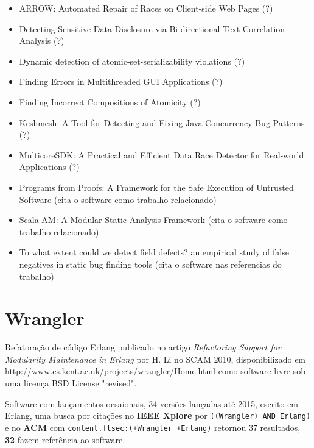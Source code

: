 \begin{itemize}
\item ARROW: Automated Repair of Races on Client-side Web Pages (?)
\item Detecting Sensitive Data Disclosure via Bi-directional Text Correlation Analysis (?)
\item Dynamic detection of atomic-set-serializability violations (?)
\item Finding Errors in Multithreaded GUI Applications (?)
\item Finding Incorrect Compositions of Atomicity (?)
\item Keshmesh: A Tool for Detecting and Fixing Java Concurrency Bug Patterns (?)
\item MulticoreSDK: A Practical and Efficient Data Race Detector for Real-world Applications (?)
\item Programs from Proofs: A Framework for the Safe Execution of Untrusted Software (cita o software como trabalho relacionado)
\item Scala-AM: A Modular Static Analysis Framework (cita o software como trabalho relacionado)
\item To what extent could we detect field defects? an empirical study of false negatives in static bug finding tools (cita o software nas referencias do trabalho)
\end{itemize}

\section{Wrangler}

Refatoração de código Erlang
publicado no artigo {\it Refactoring Support for Modularity Maintenance in Erlang}
por H. Li
no SCAM 2010,
disponibilizado em \url{http://www.cs.kent.ac.uk/projects/wrangler/Home.html}
como software livre
sob uma licença BSD License "revised".

Software com lançamentos ocsaionais,
34 versões lançadas
até 2015,
escrito em Erlang,
uma busca por citações no {\bf IEEE Xplore} por
\texttt{((Wrangler) AND Erlang)}
e no {\bf ACM} com
\texttt{content.ftsec:(+Wrangler +Erlang)}
retornou
37 resultados,
{\bf 32} fazem referência ao software.

